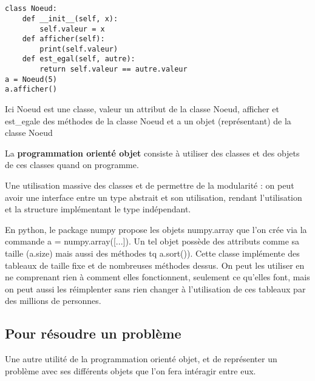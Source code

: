\begin{example} \label{2-3}\enspace \\ \\
	\begin{minipage}{0.60 \linewidth}
		\begin{lstlisting}
class Noeud:
    def __init__(self, x):
        self.valeur = x
    def afficher(self):
        print(self.valeur)
    def est_egal(self, autre):
        return self.valeur == autre.valeur
a = Noeud(5)
a.afficher()
		\end{lstlisting}
	\end{minipage}\quad \begin{minipage}{0.35\linewidth}
		Ici Noeud est une classe, valeur un attribut de la classe Noeud, afficher et est\_egale des méthodes de la classe Noeud et a un objet (représentant) de la classe Noeud
	\end{minipage}
\end{example}

\begin{definition}
	La \textbf{programmation orienté objet} consiste à utiliser des classes et des objets de ces classes quand on programme.
\end{definition}

\begin{rem}
	Une utilisation massive des classes et de permettre de la modularité : on peut avoir une interface entre un type abstrait et son utilisation, rendant l'utilisation et la structure implémentant le type indépendant.
\end{rem}

\begin{example}
	En python, le package numpy propose les objets numpy.array que l’on crée via la commande
	a = numpy.array([...]). Un tel objet possède des attributs comme sa taille (a.size) mais aussi des
	méthodes tq a.sort()). Cette classe implémente des tableaux de taille fixe et de nombreuses méthodes dessus. On peut les utiliser en ne comprenant rien à comment elles fonctionnent, seulement ce qu'elles font, mais on peut aussi les réimplenter sans rien changer à l'utilisation de ces tableaux par des millions de personnes.
\end{example}

\subsection{Pour résoudre un problème}

Une autre utilité de la programmation orienté objet, et de représenter un problème avec ses différents objets que l'on fera intéragir entre eux.

